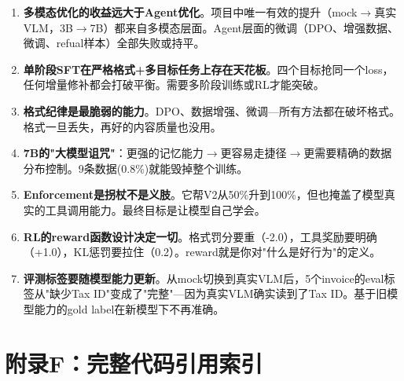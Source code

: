 \documentclass[fontset=none,11pt,a4paper]{ctexart}
\begin{document}
\begin{enumerate}[label=\textbf{\arabic*}. ,leftmargin=*]

\item \textbf{多模态优化的收益远大于Agent优化}。项目中唯一有效的提升（mock$\to$真实VLM，3B$\to$7B）都来自多模态层面。Agent层面的微调（DPO、增强数据、微调、refual样本）全部失败或持平。

\item \textbf{单阶段SFT在严格格式+多目标任务上存在天花板}。四个目标抢同一个loss，任何增量修补都会打破平衡。需要多阶段训练或RL才能突破。

\item \textbf{格式纪律是最脆弱的能力}。DPO、数据增强、微调---所有方法都在破坏格式。格式一旦丢失，再好的内容质量也没用。

\item \textbf{7B的"大模型诅咒"}：更强的记忆能力$\to$更容易走捷径$\to$更需要精确的数据分布控制。9条数据(0.8\%)就能毁掉整个训练。

\item \textbf{Enforcement是拐杖不是义肢}。它帮V2从50\%升到100\%，但也掩盖了模型真实的工具调用能力。最终目标是让模型自己学会。

\item \textbf{RL的reward函数设计决定一切}。格式罚分要重（-2.0），工具奖励要明确（+1.0），KL惩罚要拉住（0.2）。reward就是你对"什么是好行为"的定义。

\item \textbf{评测标签要随模型能力更新}。从mock切换到真实VLM后，5个invoice的eval标签从"缺少Tax ID"变成了"完整"---因为真实VLM确实读到了Tax ID。基于旧模型能力的gold label在新模型下不再准确。

\end{enumerate}

\section{附录F：完整代码引用索引}
\end{document}
